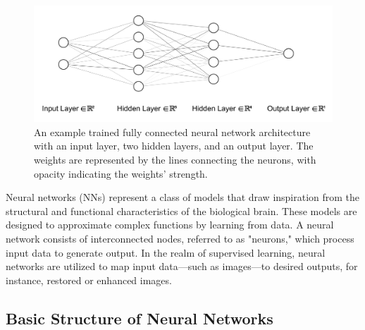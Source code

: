 \begin{figure}[h]
    \centering
    \includegraphics[width=1\linewidth]{images/simple_nn_architecture.pdf}
    \caption{An example trained fully connected neural network architecture with an input layer, two hidden layers, and an output layer. The weights are represented by the lines connecting the neurons, with opacity indicating the weights' strength.}
    \label{fig:simple-nn-architecture}
\end{figure}
Neural networks (NNs) represent a class of models that draw inspiration from the structural and functional characteristics of the biological brain. These models are designed to approximate complex functions by learning from data. A neural network consists of interconnected nodes, referred to as "neurons," which process input data to generate output. In the realm of supervised learning, neural networks are utilized to map input data—such as images—to desired outputs, for instance, restored or enhanced images.

\subsection{Basic Structure of Neural Networks}



